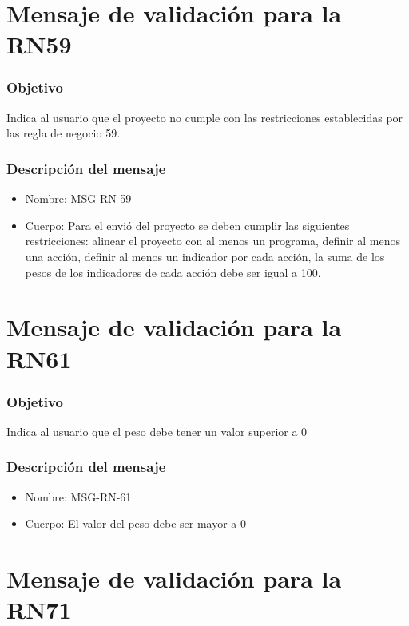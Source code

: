 \section{Mensaje de validación para la RN59} \label{MSG_RN59}

\subsubsection{Objetivo}
Indica al usuario que el proyecto no cumple con las restricciones establecidas por las regla de negocio 59.

\subsubsection{Descripción del mensaje}
\begin{itemize}
\item Nombre: MSG-RN-59
\item Cuerpo: Para el envió del proyecto se deben cumplir las siguientes restricciones: alinear el proyecto con al menos un programa, definir al menos una acción, definir al menos un indicador por cada acción, la suma de los pesos de los indicadores de cada acción debe ser igual a 100. 
\end{itemize}

\section{Mensaje de validación para la RN61} \label{MSG_RN59}

\subsubsection{Objetivo}
Indica al usuario que el peso debe tener un valor superior a 0

\subsubsection{Descripción del mensaje}
\begin{itemize}
\item Nombre: MSG-RN-61
\item Cuerpo: El valor del peso debe ser mayor a 0
\end{itemize}

\section{Mensaje de validación para la RN71} \label{MSG_RN71}

